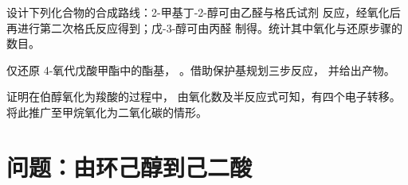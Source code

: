 \begin{exercise}[$\star\star\star$]\label{exo:b1:organic-redox:10}
设计下列化合物的合成路线：2-甲基丁-2-醇可由乙醛与格氏试剂
反应，经氧化后再进行第二次格氏反应得到；戊-3-醇可由丙醛
制得。统计其中氧化与还原步骤的数目。
\end{exercise}

\begin{exercise}[$\star\star\star$]\label{exo:b1:organic-redox:11}
仅还原 4-氧代戊酸甲酯中的酯基，
。借助保护基规划三步反应，
并给出产物。
\end{exercise}

\begin{exercise}[$\star\star\star$]\label{exo:b1:organic-redox:12}
证明在伯醇氧化为羧酸的过程中，
由氧化数及半反应式可知，有四个电子转移。
将此推广至甲烷氧化为二氧化碳的情形。
\end{exercise}

\section{问题：由环己醇到己二酸}

